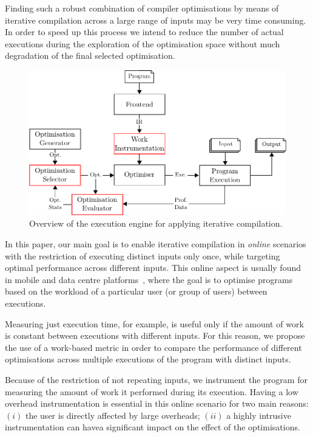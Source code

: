 \documentclass[sigplan,10pt]{acmart}
\newcommand{\itercomp}{{iterative compilation}}
\begin{document}
Finding such a robust combination of compiler optimisations by means of {\itercomp} across a large range of inputs may be very time consuming.
In order to speed up this process we intend to reduce the number of actual executions during the exploration of the optimisation space without much degradation of the final selected optimisation.

\begin{figure}[htb]
    \centering
    \includegraphics[width=\linewidth]{figs/infra-diagram}
    \caption{Overview of the execution engine for applying {\itercomp}.}
    \label{fig:infra-diagram}
\end{figure}

In this paper, our main goal is to enable {\itercomp} in \textit{online} scenarios with the restriction of executing distinct inputs only once, while targeting optimal performance across different inputs.
This online aspect is usually found in mobile and data centre platforms~\cite{chen12b,fang15,mpeis16}, where the goal is to optimise programs based on the workload of a particular user (or group of users) between executions.

Measuring just execution time, for example, is useful only if the amount of work is constant between executions with different inputs.
For this reason, we propose the use of a work-based metric in order to compare the performance of different optimisations across multiple executions of the program with distinct inputs.

Because of the restriction of not repeating inputs, we instrument the program for measuring the amount of work it performed during its execution.
Having a low overhead instrumentation is essential in this online scenario for two main reasons:
$(i)$ the user is directly affected by large overheads;
$(ii)$ a highly intrusive instrumentation can havea significant impact on the effect of the optimisations.
\end{document}
